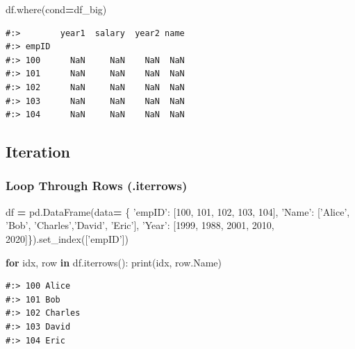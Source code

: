 \documentclass[
]{book}
\newenvironment{Shaded}{\begin{snugshade}}{\end{snugshade}}
\newcommand{\BuiltInTok}[1]{#1}
\newcommand{\ControlFlowTok}[1]{\textcolor[rgb]{0.27,0.27,0.27}{\textbf{#1}}}
\newcommand{\DecValTok}[1]{\textcolor[rgb]{0.06,0.06,0.06}{#1}}
\newcommand{\KeywordTok}[1]{\textcolor[rgb]{0.27,0.27,0.27}{\textbf{#1}}}
\newcommand{\NormalTok}[1]{#1}
\newcommand{\OperatorTok}[1]{\textcolor[rgb]{0.43,0.43,0.43}{\textbf{#1}}}
\newcommand{\StringTok}[1]{\textcolor[rgb]{0.5,0.5,0.5}{#1}}
\begin{document}
\begin{Shaded}
\begin{Highlighting}[]
\NormalTok{df.where(cond}\OperatorTok{=}\NormalTok{df_big)}
\end{Highlighting}
\end{Shaded}

\begin{verbatim}
#:>        year1  salary  year2 name
#:> empID                           
#:> 100      NaN     NaN    NaN  NaN
#:> 101      NaN     NaN    NaN  NaN
#:> 102      NaN     NaN    NaN  NaN
#:> 103      NaN     NaN    NaN  NaN
#:> 104      NaN     NaN    NaN  NaN
\end{verbatim}

\hypertarget{iteration}{%
\subsection{Iteration}\label{iteration}}

\hypertarget{loop-through-rows-.iterrows}{%
\subsubsection{Loop Through Rows (.iterrows)}\label{loop-through-rows-.iterrows}}

\begin{Shaded}
\begin{Highlighting}[]
\NormalTok{df }\OperatorTok{=}\NormalTok{ pd.DataFrame(data}\OperatorTok{=}
\NormalTok{    \{ }\StringTok{'empID'}\NormalTok{:  [}\DecValTok{100}\NormalTok{,      }\DecValTok{101}\NormalTok{,    }\DecValTok{102}\NormalTok{,      }\DecValTok{103}\NormalTok{,     }\DecValTok{104}\NormalTok{],}
      \StringTok{'Name'}\NormalTok{:   [}\StringTok{'Alice'}\NormalTok{,  }\StringTok{'Bob'}\NormalTok{,  }\StringTok{'Charles'}\NormalTok{,}\StringTok{'David'}\NormalTok{, }\StringTok{'Eric'}\NormalTok{],}
      \StringTok{'Year'}\NormalTok{:   [}\DecValTok{1999}\NormalTok{,     }\DecValTok{1988}\NormalTok{,   }\DecValTok{2001}\NormalTok{,     }\DecValTok{2010}\NormalTok{,     }\DecValTok{2020}\NormalTok{]\}).set_index([}\StringTok{'empID'}\NormalTok{])}

\ControlFlowTok{for}\NormalTok{ idx, row }\KeywordTok{in}\NormalTok{ df.iterrows():}
  \BuiltInTok{print}\NormalTok{(idx, row.Name)}
\end{Highlighting}
\end{Shaded}

\begin{verbatim}
#:> 100 Alice
#:> 101 Bob
#:> 102 Charles
#:> 103 David
#:> 104 Eric
\end{verbatim}
\end{document}
